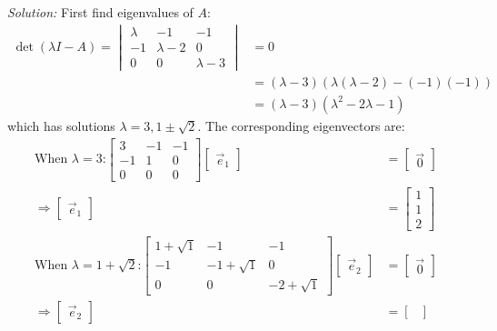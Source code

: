 \documentclass[11pt]{homework}
\begin{document}
\emph{Solution:}
\newline
First find eigenvalues of $A$:
\begin{align*}
\det (\lambda I - A) = 
  \begin{vmatrix}
  \lambda & -1 & -1 \\
  -1 & \lambda -2 & 0 \\
  0 & 0 & \lambda-3
  \end{vmatrix} 
  &= 0 \\
  &= (\lambda-3) ( \lambda (\lambda-2) - (-1)(-1)) \\
  &= (\lambda-3) ( \lambda^2 - 2 \lambda -1 )
\end{align*}
which has solutions $\lambda = 3, 1\pm \sqrt{2}$.
The corresponding eigenvectors are:
\begin{align*}
  \text{When $\lambda = 3$:}
  \begin{bmatrix}
  3  & -1 & -1 \\
  -1 & 1 & 0 \\
  0 & 0 & 0
  \end{bmatrix}
  \begin{bmatrix}
    \vec e_1
  \end{bmatrix}
  &= 
  \begin{bmatrix}
    \vec 0
  \end{bmatrix} \\
  \Rightarrow
  \begin{bmatrix}
    \vec e_1
  \end{bmatrix}
  &= 
  \begin{bmatrix}
    1 \\
    1 \\  
    2
  \end{bmatrix}  \\
\text{When $\lambda = 1 + \sqrt{2}$:}
  \begin{bmatrix}
  1+ \sqrt{1}  & -1 & -1 \\
  -1 & -1 + \sqrt{1} & 0 \\
  0 & 0 & -2 + \sqrt{1}
  \end{bmatrix}
  \begin{bmatrix}
    \vec e_2
  \end{bmatrix}
  &= 
  \begin{bmatrix}
    \vec 0
  \end{bmatrix} \\
  \Rightarrow
  \begin{bmatrix}
    \vec e_2
  \end{bmatrix}
  &= 
  \begin{bmatrix}

\end{bmatrix}
\end{align*}
\end{document}
